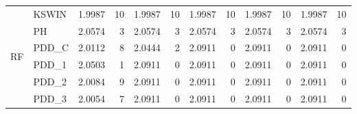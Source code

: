 \begin{table}[h]
{\begin{tabular}{llcrcrcrcrcr}
        \multirow{6}{*}{RF} & KSWIN & 1.9987 & 10 & 1.9987 & 10 & 1.9987 & 10 & 1.9987 & 10 & 1.9987 & 10 \\
         & PH & 2.0574 & 3 & 2.0574 & 3 & 2.0574 & 3 & 2.0574 & 3 & 2.0574 & 3 \\
         & PDD\_C & 2.0112 & 8 & 2.0444 & 2 & 2.0911 & 0 & 2.0911 & 0 & 2.0911 & 0 \\
         & PDD\_1 & 2.0503 & 1 & 2.0911 & 0 & 2.0911 & 0 & 2.0911 & 0 & 2.0911 & 0 \\
         & PDD\_2 & 2.0084 & 9 & 2.0911 & 0 & 2.0911 & 0 & 2.0911 & 0 & 2.0911 & 0 \\
         & PDD\_3 & 2.0054 & 7 & 2.0911 & 0 & 2.0911 & 0 & 2.0911 & 0 & 2.0911 & 0 \\\bottomrule
    \end{tabular}}
\end{table}

